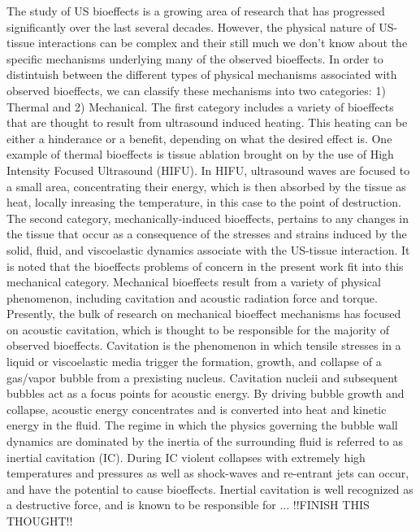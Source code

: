 The study of US bioeffects is a growing area of research that has progressed significantly over the last several decades.
However, the physical nature of US-tissue interactions can be complex and their still much we don't know about the specific mechanisms underlying many of the observed bioeffects.
In order to distintuish between the different types of physical mechanisms associated with observed bioeffects, we can classify these mechanisms into two categories: 1) Thermal and 2) Mechanical.
The first category includes a variety of bioeffects that are thought to result from ultrasound induced heating.  This heating can be either a hinderance or a benefit, depending on what the desired effect is.
One example of thermal bioeffects is tissue ablation brought on by the use of High Intensity Focused Ultrasound (HIFU).
In HIFU, ultrasound waves are focused to a small area, concentrating their energy, which is then absorbed by the tissue as heat, locally inreasing the temperature, in this case to the point of destruction.
The second category, mechanically-induced bioeffects, pertains to any changes in the tissue that occur as a consequence of the stresses and strains induced by the solid, fluid, and viscoelastic dynamics associate with the US-tissue interaction.
It is noted that the bioeffects problems of concern in the present work fit into this mechanical category.
Mechanical bioeffects result from a variety of physical phenomenon, including cavitation and acoustic radiation force and torque.
Presently, the bulk of research on mechanical bioeffect mechanisms has focused on acoustic cavitation, which is thought to be responsible for the majority of observed bioeffects.
Cavitation is the phenomenon in which tensile stresses in a liquid or viscoelastic media trigger the formation, growth, and collapse of a gas/vapor bubble from a prexisting nucleus.
Cavitation nucleii and subsequent bubbles act as a focus points for acoustic energy.
By driving bubble growth and collapse, acoustic energy concentrates and is converted into heat and kinetic energy in the fluid.
The regime in which the physics governing the bubble wall dynamics are dominated by the inertia of the surrounding fluid is referred to as inertial cavitation (IC).
During IC violent collapses with extremely high temperatures and pressures as well as shock-waves and re-entrant jets can occur, and have the potential to cause bioeffects.
Inertial cavitation is well recognized as a destructive force, and is known to be responsible for ... !!FINISH THIS THOUGHT!!




